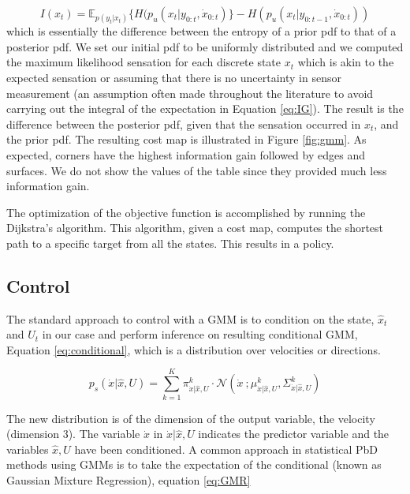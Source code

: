 
\begin{equation}\label{eq:IG}
 I(x_t) = \mathbb{E}_{p(y_t|x_t)}\{ H(p_u(x_t|y_{0:t},\dot{x}_{0:t}) \} - H(p_u(x_t|y_{0:t-1},\dot{x}_{0:t}))
\end{equation}
which is essentially the difference between the entropy of a prior pdf to that of a posterior pdf.
We set our initial pdf to be uniformly distributed and  we computed the maximum likelihood sensation for each discrete state $x_t$
which is akin to the expected sensation or assuming that there is no uncertainty in sensor measurement (an assumption 
often made throughout the literature to avoid carrying out the integral of the expectation in Equation \ref{eq:IG}).
The result is the difference between the posterior pdf, given that the sensation occurred in $x_t$, and the prior pdf. The resulting cost
map is illustrated in Figure \ref{fig:gmm}. As expected, corners have the highest information gain followed by edges and surfaces. 
We do not show the values of the table since they provided much less information gain.

The optimization of the objective function is accomplished by running the Dijkstra's algorithm. This algorithm, given a cost map, 
computes the shortest path to a specific target from all the states. This results in a policy.

\subsection{Control}
The standard approach to control with a GMM is to condition on the state,
$\hat{x}_t$ and $U_t$ in our case and perform inference on resulting conditional
GMM, Equation \ref{eq:conditional}, which is a distribution over velocities or directions.

\begin{equation} \label{eq:conditional}
  p_s(\dot{x}|\hat{x},U) = \sum\limits_{k=1}^{K} \pi^{k}_{\dot{x}|\hat{x},U} \cdot  \mathcal{N}\left(\dot{x}\: ;  \mu^{k}_{\dot{x}|\hat{x},U}, \Sigma^{k}_{\dot{x}|\hat{x},U} \right)
\end{equation}

The new distribution is of the dimension of the output variable, the velocity (dimension 3). 
The variable $\dot{x}$ in $\dot{x}|\hat{x},U$ indicates the predictor variable and the variables $\hat{x},U$ have been conditioned.
A common approach in statistical PbD methods using GMMs is to take the expectation of the conditional (known as Gaussian Mixture Regression), equation \ref{eq:GMR}

